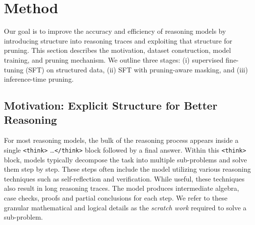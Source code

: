 \documentclass{article}
\newcommand{\zain}[1]{{\color{blue}[ZS: #1]}}
\begin{document}

\section{Method}
Our goal is to improve the accuracy and efficiency of reasoning models by introducing structure into reasoning traces and exploiting that structure for pruning. This section describes the motivation, dataset construction, model training, and pruning mechanism. We outline three stages: (i) supervised fine-tuning (SFT) on structured data, (ii) SFT with pruning-aware masking, and (iii) inference-time pruning.

\subsection{Motivation: Explicit Structure for Better Reasoning}
For most reasoning models, the bulk of the reasoning process appears inside a single \texttt{<think>} \dots \texttt{</think>} block followed by a final answer. Within this \texttt{<think>} block, models typically decompose the task into multiple sub-problems and solve them step by step. These steps often include the model utilizing various reasoning techniques such as self-reflection and verification. While useful, these techniques also result in long reasoning traces. The model produces intermediate algebra, case checks, proofs and partial conclusions for each step. We refer to these granular mathematical and logical details as the \emph{scratch work} required to solve a sub-problem. 
\end{document}
